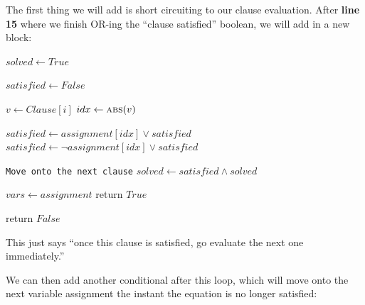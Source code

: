 The first thing we will add is short circuiting to our clause evaluation. After
\textbf{line 15} where we finish OR-ing the ``clause satisfied'' boolean, we will add in
a new block:

\begin{algorithm}[H]
\caption{Brute Force}\label{alg:4}
\begin{algorithmic}[1]

    \State $solved \gets True$

        \State $satisfied \gets False$

            \State $v \gets Clause[i]$
            \State $idx \gets \Call{abs}{v}$

                \State $satisfied \gets assignment[idx] \vee satisfied$
            \Else 
                \State $satisfied \gets \neg assignment[idx] \vee satisfied$
            \EndIf

                \State \texttt{Move onto the next clause}
            \EndIf
        \EndFor
        \State $solved \gets satisfied \wedge solved$
    \EndFor

        \State $vars \gets assignment$
        \State return $True$
    \EndIf
\EndFor

\State return $False$
\EndProcedure
\end{algorithmic}
\end{algorithm}

This just says ``once this clause is satisfied, go evaluate the next one
immediately.''

We can then add another conditional after this loop, which will move onto the
next variable assignment the instant the equation is no longer satisfied:

